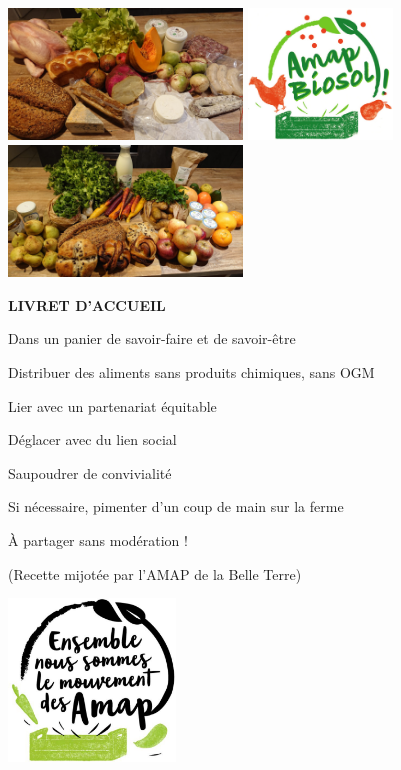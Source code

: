 \documentclass[10pt,a4paper,french]{article}
\begin{document}
\includegraphics[height=3.5cm]{Gauche.jpg}
\includegraphics[height=3.5cm]{Centre.jpg}
\includegraphics[height=3.5cm]{Droite.jpg}
\vspace{30ex}

\begin{center}
{\bf\color{ForestGreen} LIVRET D'ACCUEIL {\the\year{}}}
\vspace{1ex}

Dans un panier de savoir-faire et de savoir-être

Distribuer des aliments sans produits chimiques, sans OGM

Lier avec un partenariat équitable

Déglacer avec du lien social

Saupoudrer de convivialité

Si nécessaire, pimenter d'un coup de main sur la ferme

À partager sans modération !
\vspace{1ex}

{\small (Recette mijotée par l'AMAP de la Belle Terre)}
\vspace{30ex}

\includegraphics[width=0.3333\textwidth]{Ensemble.jpg}
\end{center}
\end{document}
